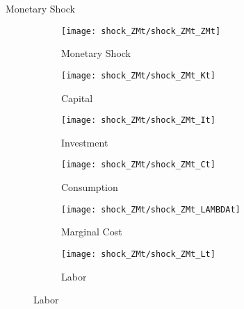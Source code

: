 \documentclass[
presentation.tex
]{subfiles}
\begin{document}
\begin{frame}{Monetary Shock}
	
	\begin{figure}[h!]
		\centering
		\begin{subfigure}[b]{0.3\textwidth}
			\centering
			\texttt{[image: shock\_ZMt/shock\_ZMt\_ZMt]}
			\caption{Monetary Shock}
			\label{fig:ZMt-monetary-shock}
		\end{subfigure}
		\hfill
		\begin{subfigure}[b]{0.3\textwidth}
			\centering
			\texttt{[image: shock\_ZMt/shock\_ZMt\_Kt]}
			\caption{Capital}
			\label{fig:ZMt-capital}
		\end{subfigure}
		\hfill
		\begin{subfigure}[b]{0.3\textwidth}
			\centering
			\texttt{[image: shock\_ZMt/shock\_ZMt\_It]}
			\caption{Investment}
			\label{fig:ZMt-investment}
		\end{subfigure}
		\hfill
		
		\vspace*{0.5cm}
		
		\begin{subfigure}[b]{0.3\textwidth}
			\centering
			\texttt{[image: shock\_ZMt/shock\_ZMt\_Ct]}
			\caption{Consumption}
			\label{fig:ZMt-consumption}
		\end{subfigure}
		\hfill
		\begin{subfigure}[b]{0.3\textwidth}
			\centering
			\texttt{[image: shock\_ZMt/shock\_ZMt\_LAMBDAt]}
			\caption{Marginal Cost}
			\label{fig:ZMt-marginal-cost}
		\end{subfigure}
		\hfill
		\begin{subfigure}[b]{0.3\textwidth}
			\centering
			\texttt{[image: shock\_ZMt/shock\_ZMt\_Lt]}
			\caption{Labor}
			\label{fig:ZMt-labor}
		\end{subfigure}
		\hfill
		
	\end{figure}
	
\end{frame}
\end{document}
